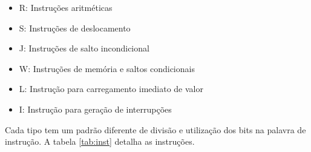 \begin{itemize}

\item R: Instruções aritméticas
\item S: Instruções de deslocamento
\item J: Instruções de salto incondicional
\item W: Instruções de memória e saltos condicionais
\item L: Instrução para carregamento imediato de valor
\item I: Instrução para geração de interrupções

\end{itemize}

Cada tipo tem um padrão diferente de divisão e utilização dos bits na palavra de instrução. A tabela \ref{tab:inst} detalha as instruções.

